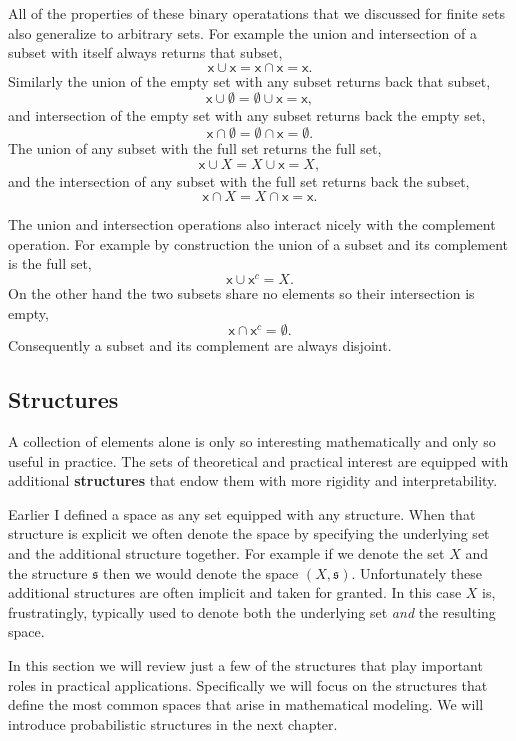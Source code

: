 \documentclass[
  letterpaper,
  DIV=11,
  numbers=noendperiod]{scrartcl}
\begin{document}
All of the properties of these binary operatations that we discussed for
finite sets also generalize to arbitrary sets. For example the union and
intersection of a subset with itself always returns that subset, \[
\mathsf{x} \cup \mathsf{x} = \mathsf{x} \cap \mathsf{x} = \mathsf{x}.
\] Similarly the union of the empty set with any subset returns back
that subset, \[
\mathsf{x} \cup \emptyset = \emptyset \cup \mathsf{x} = \mathsf{x},
\] and intersection of the empty set with any subset returns back the
empty set, \[
\mathsf{x} \cap \emptyset = \emptyset \cap \mathsf{x} = \emptyset.
\] The union of any subset with the full set returns the full set, \[
\mathsf{x} \cup X = X \cup \mathsf{x} = X,
\] and the intersection of any subset with the full set returns back the
subset, \[
\mathsf{x} \cap X = X \cap \mathsf{x} = \mathsf{x}.
\]

The union and intersection operations also interact nicely with the
complement operation. For example by construction the union of a subset
and its complement is the full set, \[
\mathsf{x} \cup \mathsf{x}^{c} = X.
\] On the other hand the two subsets share no elements so their
intersection is empty, \[
\mathsf{x} \cap \mathsf{x}^{c} = \emptyset.
\] Consequently a subset and its complement are always disjoint.

\hypertarget{sec:structures}{%
\subsection{Structures}\label{sec:structures}}

A collection of elements alone is only so interesting mathematically and
only so useful in practice. The sets of theoretical and practical
interest are equipped with additional \textbf{structures} that endow
them with more rigidity and interpretability.

Earlier I defined a space as any set equipped with any structure. When
that structure is explicit we often denote the space by specifying the
underlying set and the additional structure together. For example if we
denote the set \(X\) and the structure \(\mathfrak{s}\) then we would
denote the space \((X, \mathfrak{s})\). Unfortunately these additional
structures are often implicit and taken for granted. In this case \(X\)
is, frustratingly, typically used to denote both the underlying set
\emph{and} the resulting space.

In this section we will review just a few of the structures that play
important roles in practical applications. Specifically we will focus on
the structures that define the most common spaces that arise in
mathematical modeling. We will introduce probabilistic structures in the
next chapter.
\end{document}
